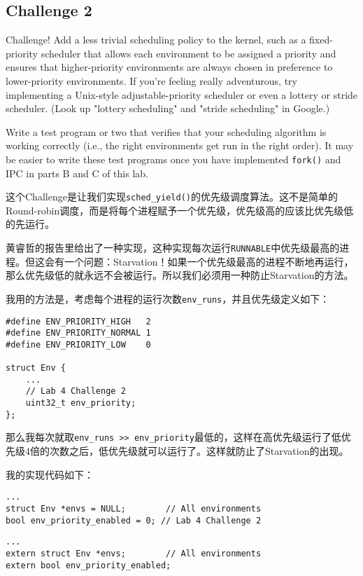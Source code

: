 \documentclass[11pt]{article}
\begin{document}
\subsection{Challenge 2}
\begin{framed}
Challenge! Add a less trivial scheduling policy to the kernel, such as a fixed-priority scheduler that allows each environment to be assigned a priority and ensures that higher-priority environments are always chosen in preference to lower-priority environments. If you're feeling really adventurous, try implementing a Unix-style adjustable-priority scheduler or even a lottery or stride scheduler. (Look up "lottery scheduling" and "stride scheduling" in Google.)

Write a test program or two that verifies that your scheduling algorithm is working correctly (i.e., the right environments get run in the right order). It may be easier to write these test programs once you have implemented \lstinline|fork()| and IPC in parts B and C of this lab.
\end{framed}
这个Challenge是让我们实现\lstinline|sched_yield()|的优先级调度算法。这不是简单的Round-robin调度，而是将每个进程赋予一个优先级，优先级高的应该比优先级低的先运行。

黄睿哲的报告里给出了一种实现，这种实现每次运行\lstinline|RUNNABLE|中优先级最高的进程。但这会有一个问题：Starvation！如果一个优先级最高的进程不断地再运行，那么优先级低的就永远不会被运行。所以我们必须用一种防止Starvation的方法。

我用的方法是，考虑每个进程的运行次数\lstinline|env_runs|，并且优先级定义如下：
\begin{lstlisting}[title=inc/env.h]
#define ENV_PRIORITY_HIGH   2
#define ENV_PRIORITY_NORMAL 1  
#define ENV_PRIORITY_LOW    0

struct Env {
	...
	// Lab 4 Challenge 2
	uint32_t env_priority;
};
\end{lstlisting}
那么我每次就取\lstinline|env_runs >> env_priority|最低的，这样在高优先级运行了低优先级4倍的次数之后，低优先级就可以运行了。这样就防止了Starvation的出现。

我的实现代码如下：
\begin{lstlisting}[title=kern/env.c]
...
struct Env *envs = NULL;		// All environments
bool env_priority_enabled = 0; // Lab 4 Challenge 2
\end{lstlisting}

\begin{lstlisting}[title=kern/env.h]
...
extern struct Env *envs;		// All environments
extern bool env_priority_enabled;
\end{lstlisting}
\end{document}
